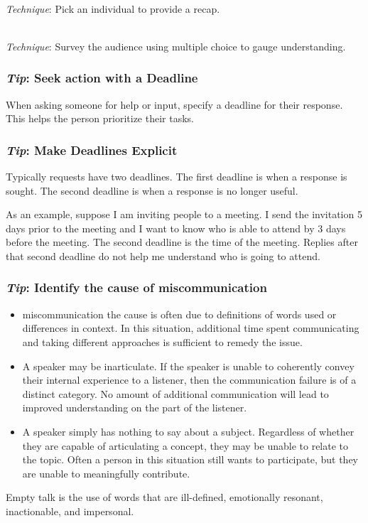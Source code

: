\ \\
\textit{Technique}: Pick an individual to provide a recap.

\ \\
\textit{Technique}: Survey the audience using multiple choice to gauge understanding.

\subsubsection*{\textit{Tip}: Seek action with a Deadline}

When asking someone for help or input, specify a deadline for their response. This helps the person prioritize their tasks.


\subsubsection*{\textit{Tip}: Make Deadlines Explicit}

Typically requests have two deadlines. The first deadline is when a response is sought. The second deadline is when a response is no longer useful.  

As an example, suppose I am inviting people to a meeting. I send the invitation 5 days prior to the meeting and I want to know who is able to attend by 3 days before the meeting. The second deadline is the time of the meeting. Replies after that second deadline do not help me understand who is going to attend. 


\subsubsection*{\textit{Tip}: Identify the cause of miscommunication}

\begin{itemize}
    \item miscommunication the cause is often due to definitions of words used or differences in context. In this situation, additional time spent communicating and taking different approaches is sufficient to remedy the issue.
\item A speaker may be inarticulate. If the speaker is unable to coherently convey their internal experience to a listener, then the communication failure is of a distinct category. No amount of additional communication will lead to improved understanding on the part of the listener.
\item A speaker simply has nothing to say about a subject. Regardless of whether they are capable of articulating a concept, they may be unable to relate to the topic. Often a person in this situation still wants to participate, but they are unable to meaningfully contribute. 
\end{itemize}
Empty talk is the use of words that are ill-defined, emotionally resonant, inactionable, and impersonal.

